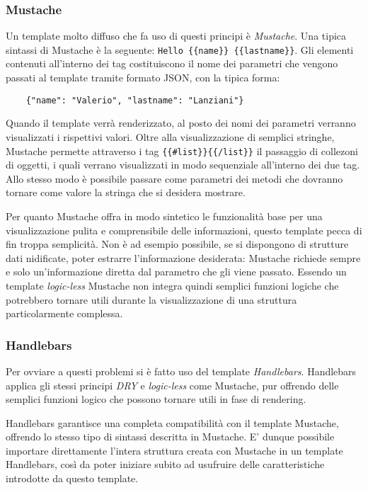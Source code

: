\subsubsection{Mustache} %
\label{ssub:mustache}
Un template molto diffuso che fa uso di questi principi è {\itshape Mustache}.
Una tipica sintassi di Mustache è la seguente: \lstinline!Hello {{name}} {{lastname}}!. Gli elementi contenuti all'interno dei tag {{}} costituiscono il nome dei parametri che vengono passati al template tramite formato JSON, con la tipica forma:
\begin{lstlisting}
    {"name": "Valerio", "lastname": "Lanziani"}
\end{lstlisting}
Quando il template verrà renderizzato, al posto dei nomi dei parametri verranno visualizzati i rispettivi valori. Oltre alla visualizzazione di semplici stringhe, Mustache permette attraverso i tag \lstinline!{{#list}}{{/list}}! il passaggio di collezoni di oggetti, i quali verrano visualizzati in modo sequenziale all'interno dei due tag. Allo stesso modo è possibile passare come parametri dei metodi che dovranno tornare come valore la stringa che si desidera mostrare.

Per quanto Mustache offra in modo sintetico le funzionalità base per una visualizzazione pulita e comprensibile delle informazioni, questo template pecca di fin troppa semplicità.
Non è ad esempio possibile, se si dispongono di strutture dati nidificate, poter estrarre l'informazione desiderata: Mustache richiede sempre e solo un'informazione diretta dal parametro che gli viene passato.
Essendo un template {\itshape logic-less} Mustache non integra quindi semplici funzioni logiche che potrebbero tornare utili durante la visualizzazione di una struttura particolarmente complessa.

\subsubsection{Handlebars} %
\label{ssub:handlebars}
Per ovviare a questi problemi si è fatto uso del template {\itshape Handlebars}.
Handlebars applica gli stessi principi {\itshape DRY} e {\itshape logic-less} come Mustache, pur offrendo delle semplici funzioni logico che possono tornare utili in fase di rendering.

Handlebars garantisce una completa compatibilità con il template Mustache, offrendo lo stesso tipo di sintassi descritta in Mustache. E' dunque possibile importare direttamente l'intera struttura creata con Mustache in un template Handlebars, così da poter iniziare subito ad usufruire delle caratteristiche introdotte da questo template.

